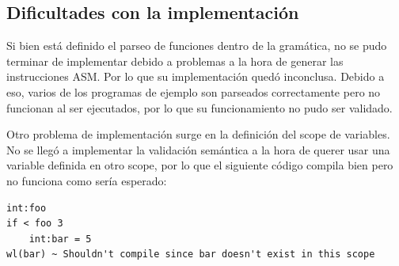 \documentclass{article}
\begin{document}
        \subsection{Dificultades con la implementación}
                \par Si bien está definido el parseo de funciones dentro de la gramática, no se pudo terminar de implementar debido a problemas a la hora de generar las instrucciones ASM. Por lo que su implementación quedó inconclusa. Debido a eso, varios de los programas de ejemplo son parseados correctamente pero no funcionan al ser ejecutados, por lo que su funcionamiento no pudo ser validado.
                \par Otro problema de implementación surge en la definición del scope de variables. No se llegó a implementar la validación semántica a la hora de querer usar una variable definida en otro scope, por lo que el siguiente código compila bien pero no funciona como sería esperado:
                \begin{lstlisting}
int:foo
if < foo 3
    int:bar = 5
wl(bar) ~ Shouldn't compile since bar doesn't exist in this scope
                \end{lstlisting}
        \clearpage
\end{document}
